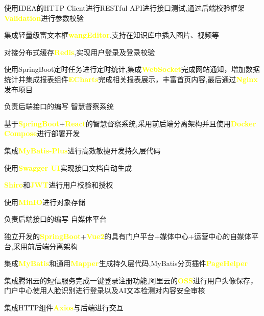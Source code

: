 \begin{cventries}
{\begin{cvitems}
			\item {使用IDEA的HTTP Client进行RESTful API进行接口测试,通过后端校验框架\textcolor{yellow}{\textbf{Validation}}进行参数校验}
			\item {集成轻量级富文本框\textcolor{yellow}{\textbf{wangEditor}},支持在知识库中插入图片、视频等}
			\item {对接分布式缓存\textcolor{yellow}{\textbf{Redis}},实现用户登录及登录校验}
			\item {使用SpringBoot定时任务进行定时统计,集成\textcolor{yellow}{\textbf{WebSocket}}完成网站通知，增加数据统计并集成报表组件\textcolor{yellow}{\textbf{ECharts}}完成相关报表展示，丰富首页内容,最后通过\textcolor{yellow}{\textbf{Nginx}}发布项目}
		\end{cvitems}
	}
	\cventry
	{负责后端接口的编写} %
	{智慧督察系统} %
	{} %
	{} %
	{
		\begin{cvitems} %
			\item {基于\textcolor{yellow}{\textbf{SpringBoot}}+\textcolor{yellow}{\textbf{React}}的智慧督察系统,采用前后端分离架构并且使用\textcolor{yellow}{\textbf{Docker Compose}}进行部署开发}
			\item {集成\textcolor{yellow}{\textbf{MyBatis-Plus}}进行高效敏捷开发持久层代码}
			\item {使用\textcolor{yellow}{\textbf{Swagger UI}}实现接口文档自动生成}
			\item {\textcolor{yellow}{\textbf{Shiro}}和\textcolor{yellow}{\textbf{JWT}}进行用户校验和授权}
			\item {使用\textcolor{yellow}{\textbf{MinIO}}进行对象存储}
		\end{cvitems}
	}
	\cventry
	{负责后端接口的编写} %
	{自媒体平台} %
	{} %
	{} %
	{
		\begin{cvitems} %
			\item {独立开发的\textcolor{yellow}{\textbf{SpringBoot}}+\textcolor{yellow}{\textbf{Vue2}}的具有门户平台+媒体中心+运营中心的自媒体平台,采用前后端分离架构}
			\item {集成\textcolor{yellow}{\textbf{MyBatis}}和通用\textcolor{yellow}{\textbf{Mapper}}生成持久层代码,MyBatis分页插件\textcolor{yellow}{\textbf{PageHelper}}}
			\item {集成腾讯云的短信服务完成一键登录注册功能,阿里云的\textcolor{yellow}{\textbf{OSS}}}进行用户头像保存，门户中心使用人脸识别进行登录以及AI文本检测对内容安全审核
			\item {集成HTTP组件\textcolor{yellow}{\textbf{Axios}}与后端进行交互}

\end{cvitems}}
\end{cventries}
